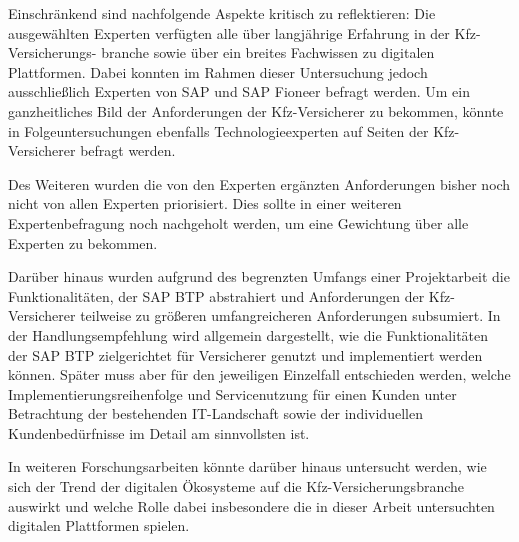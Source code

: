 
Einschränkend sind nachfolgende Aspekte kritisch zu reflektieren: Die ausgewählten Experten verfügten alle über langjährige Erfahrung in der Kfz-Versicherungs- branche sowie über ein breites Fachwissen zu digitalen Plattformen. Dabei konnten im Rahmen dieser Untersuchung jedoch ausschließlich Experten von SAP und SAP Fioneer befragt werden. Um ein ganzheitliches Bild der Anforderungen der Kfz-Versicherer zu bekommen, könnte in Folgeuntersuchungen ebenfalls Technologieexperten auf Seiten der Kfz-Versicherer befragt werden. 

Des Weiteren wurden die von den Experten ergänzten Anforderungen bisher noch nicht von allen Experten priorisiert. Dies sollte in einer weiteren Expertenbefragung noch nachgeholt werden, um eine Gewichtung über alle Experten zu bekommen. 

Darüber hinaus wurden aufgrund des begrenzten Umfangs einer Projektarbeit die Funktionalitäten, der SAP BTP abstrahiert und Anforderungen der Kfz-Versicherer teilweise zu größeren umfangreicheren Anforderungen subsumiert. In der Handlungsempfehlung wird allgemein dargestellt, wie die Funktionalitäten der SAP BTP zielgerichtet für Versicherer genutzt und implementiert werden können. Später muss aber für den jeweiligen Einzelfall entschieden werden, welche Implementierungsreihenfolge und Servicenutzung für einen Kunden unter Betrachtung der bestehenden IT-Landschaft sowie der individuellen Kundenbedürfnisse im Detail am sinnvollsten ist.

In weiteren Forschungsarbeiten könnte darüber hinaus untersucht werden, wie sich der Trend der digitalen Ökosysteme auf die Kfz-Versicherungsbranche auswirkt und welche Rolle dabei insbesondere die in dieser Arbeit untersuchten digitalen Plattformen spielen.


